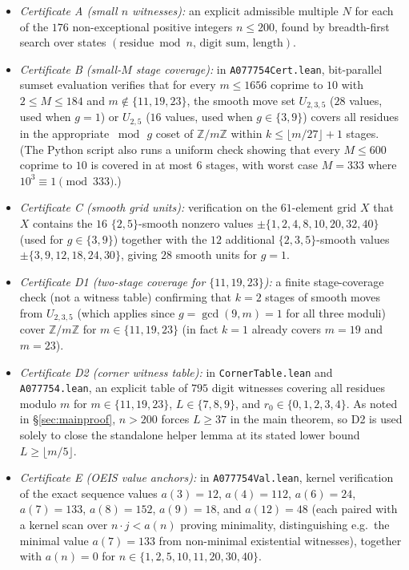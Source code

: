 \documentclass[11pt]{article}
\theoremstyle{remark}
\newcommand{\Z}{\mathbb{Z}}
\begin{document}
\begin{itemize}
\item \emph{Certificate A (small $n$ witnesses):} an explicit admissible
multiple $N$ for each of the $176$ non-exceptional positive integers
$n \le 200$, found by breadth-first search over states
$(\text{residue} \bmod n,\, \text{digit sum},\, \text{length})$.
\item \emph{Certificate B (small-$M$ stage coverage):} in
\texttt{A077754Cert.lean}, bit-parallel sumset evaluation verifies that for
every $m \le 1656$ coprime to $10$ with $2 \le M \le 184$ and
$m \notin \{11,19,23\}$, the smooth move set $U_{2,3,5}$ ($28$ values, used when
$g = 1$) or $U_{2,5}$ ($16$ values, used when $g \in \{3,9\}$) covers all
residues in the
appropriate $\bmod\, g$ coset of $\Z/m\Z$ within $k \le \lfloor m/27 \rfloor + 1$
stages. (The Python script also runs a uniform check showing that every
$M \le 600$ coprime to $10$ is covered in at most $6$ stages, with worst case
$M = 333$ where $10^3 \equiv 1 \pmod{333}$.)
\item \emph{Certificate C (smooth grid units):} verification on the $61$-element
grid $X$ that $X$ contains the $16$ $\{2,5\}$-smooth nonzero values
$\pm\{1,2,4,8,10,20,32,40\}$ (used for $g \in \{3,9\}$) together with the $12$
additional $\{2,3,5\}$-smooth values $\pm\{3,9,12,18,24,30\}$, giving $28$
smooth units for $g = 1$.
\item \emph{Certificate D1 (two-stage coverage for $\{11,19,23\}$):} a finite
stage-coverage check (not a witness table) confirming that $k = 2$ stages of
smooth moves from $U_{2,3,5}$ (which applies since $g = \gcd(9,m) = 1$ for all
three moduli) cover $\Z/m\Z$ for $m \in \{11,19,23\}$ (in fact $k = 1$ already
covers $m = 19$ and $m = 23$).
\item \emph{Certificate D2 (corner witness table):} in \texttt{CornerTable.lean}
and \texttt{A077754.lean}, an explicit table of $795$ digit witnesses covering
all residues modulo $m$ for $m \in \{11,19,23\}$, $L \in \{7,8,9\}$, and
$r_0 \in \{0,1,2,3,4\}$. As noted in \S\ref{sec:mainproof}, $n > 200$ forces
$L \ge 37$ in the main theorem, so D2 is used solely to close the standalone
helper lemma at its stated lower bound $L \ge \lfloor m/5 \rfloor$.
\item \emph{Certificate E (OEIS value anchors):} in \texttt{A077754Val.lean},
kernel verification of the exact sequence values $a(3)=12$, $a(4)=112$,
$a(6)=24$, $a(7)=133$, $a(8)=152$, $a(9)=18$, and $a(12)=48$ (each paired with
a kernel scan over $n \cdot j < a(n)$ proving minimality, distinguishing e.g.\
the minimal value $a(7) = 133$ from non-minimal existential witnesses), together
with $a(n) = 0$ for $n \in \{1,2,5,10,11,20,30,40\}$.
\end{itemize}
\end{document}
